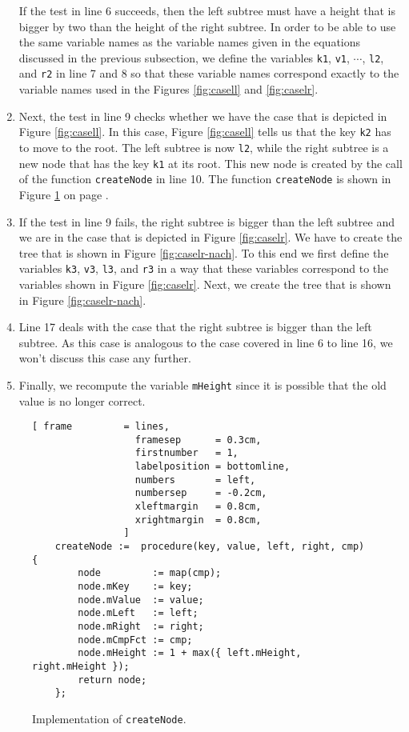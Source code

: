 \begin{enumerate}
      If the test in line 6 succeeds, then the left subtree must have a height that is bigger by
      two than the height of the right subtree.  In order to be able to use the same variable names 
      as the variable names given in the equations discussed in the previous subsection, we define
      the variables \texttt{k1}, \texttt{v1}, $\cdots$, \texttt{l2}, and \texttt{r2} in line 7 and 8
      so that these variable names correspond exactly to the variable names used in the Figures
      \ref{fig:casell} and \ref{fig:caselr}.
\item Next, the test in line 9 checks whether we have the case that is depicted in Figure
      \ref{fig:casell}.  In this case, Figure \ref{fig:casell} tells us that the key \texttt{k2}
      has to move to the root.  The left subtree is now \texttt{l2}, while the right subtree is a
      new node that has the key \texttt{k1} at its root.  This new node is created by the call
      of the function \texttt{createNode} in line 10.  The function \texttt{createNode} is shown in
      Figure \ref{fig:avl-tree.stlx:createNode} on page \pageref{fig:avl-tree.stlx:createNode}.
\item If the test in line 9 fails, the right subtree is bigger than the left subtree and we are in 
      the case that is depicted in Figure \ref{fig:caselr}.  We have to create the tree that is
      shown in Figure \ref{fig:caselr-nach}.  To this end we first define the variables 
      \texttt{k3}, \texttt{v3}, \texttt{l3}, and \texttt{r3} in a way that these variables
      correspond to the variables shown in Figure \ref{fig:caselr}.  Next, we create the tree
      that is shown in Figure \ref{fig:caselr-nach}.
\item Line 17 deals with the case that the right subtree is bigger than the left subtree. 
      As this case is analogous to the case covered in line 6 to line 16, we won't discuss this case
      any further.
\item Finally, we recompute the variable \texttt{mHeight} since it is possible that the old value is
      no longer correct.
\end{enumerate}


\begin{figure}[!ht]
\centering
\begin{Verbatim}[ frame         = lines, 
                  framesep      = 0.3cm, 
                  firstnumber   = 1,
                  labelposition = bottomline,
                  numbers       = left,
                  numbersep     = -0.2cm,
                  xleftmargin   = 0.8cm,
                  xrightmargin  = 0.8cm,
                ]
    createNode :=  procedure(key, value, left, right, cmp) {
        node         := map(cmp);
        node.mKey    := key;
        node.mValue  := value;
        node.mLeft   := left;
        node.mRight  := right;
        node.mCmpFct := cmp;
        node.mHeight := 1 + max({ left.mHeight, right.mHeight });
        return node;
    };
\end{Verbatim}
\vspace*{-0.3cm}
\caption{Implementation of \texttt{createNode}.}
\label{fig:avl-tree.stlx:createNode}
\end{figure}


